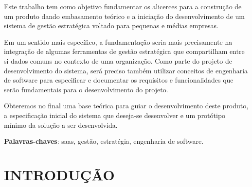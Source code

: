 \documentclass{abnt}
\begin{document}





 

\capa
\folhaderosto

\begin{resumo}

Este trabalho tem como objetivo fundamentar os alicerces para a construção de um
produto dando embasamento teórico e a iniciação do desenvolvimento de um sistema
de gestão estratégica voltado para pequenas e médias empresas.

Em um sentido mais específico, a fundamentação seria mais precisamente na
integração de algumas ferramentas de gestão estratégica que compartilham entre
si dados comuns no contexto de uma organização. Como parte do projeto de
desenvolvimento do sistema, será preciso também utilizar conceitos de
engenharia de software para especificar e documentar os requisitos e
funcionalidades que serão fundamentais para o desenvolvimento do projeto.

Obteremos no final uma base teórica para guiar o desenvolvimento deste produto,
a especificação inicial do sistema que deseja-se desenvolver e um protótipo
mínimo da solução a ser desenvolvida.

\textbf{Palavras-chaves}: saas, gestão, estratégia, engenharia de software.
\end{resumo}

\sumario %
\renewcommand*\listfigurename{LISTA DE FIGURAS}
\listoffigures %


\chapter{INTRODUÇÃO}
\end{document}
